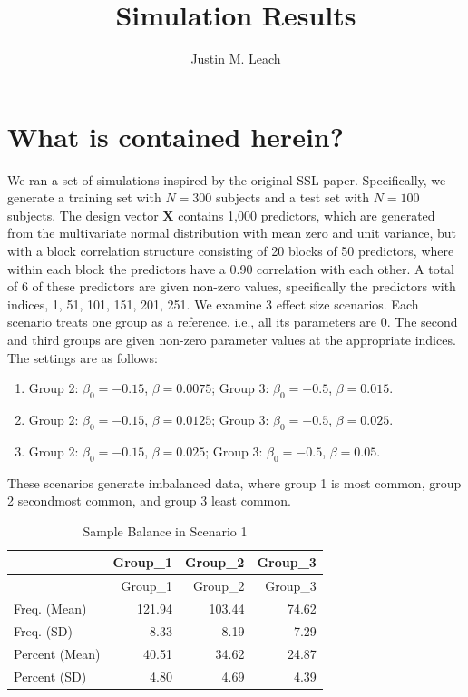 \documentclass[
]{article}
\title{Simulation Results}
\author{Justin M. Leach}
\date{}
\providecommand{\tightlist}{%
  \setlength{\itemsep}{0pt}\setlength{\parskip}{0pt}}
\begin{document}
\maketitle

\hypertarget{what-is-contained-herein}{%
\section{What is contained herein?}\label{what-is-contained-herein}}

We ran a set of simulations inspired by the original SSL paper.
Specifically, we generate a training set with \(N = 300\) subjects and a
test set with \(N = 100\) subjects. The design vector \(\bm{X}\)
contains 1,000 predictors, which are generated from the multivariate
normal distribution with mean zero and unit variance, but with a block
correlation structure consisting of 20 blocks of 50 predictors, where
within each block the predictors have a 0.90 correlation with each
other. A total of 6 of these predictors are given non-zero values,
specifically the predictors with indices, 1, 51, 101, 151, 201, 251. We
examine 3 effect size scenarios. Each scenario treats one group as a
reference, i.e., all its parameters are 0. The second and third groups
are given non-zero parameter values at the appropriate indices. The
settings are as follows:

\begin{enumerate}
\def\labelenumi{(\arabic{enumi})}
\tightlist
\item
  Group 2: \(\beta_0 = -0.15\), \(\beta = 0.0075\); Group 3:
  \(\beta_0 = -0.5\), \(\beta = 0.015\).
\item
  Group 2: \(\beta_0 = -0.15\), \(\beta = 0.0125\); Group 3:
  \(\beta_0 = -0.5\), \(\beta = 0.025\).
\item
  Group 2: \(\beta_0 = -0.15\), \(\beta = 0.025\); Group 3:
  \(\beta_0 = -0.5\), \(\beta = 0.05\).
\end{enumerate}

These scenarios generate imbalanced data, where group 1 is most common,
group 2 secondmost common, and group 3 least common.

\begin{longtable}[]{@{}lrrr@{}}
\caption{Sample Balance in Scenario 1}\tabularnewline
\toprule
& Group\_1 & Group\_2 & Group\_3 \\
\midrule
\endfirsthead
\toprule
& Group\_1 & Group\_2 & Group\_3 \\
\midrule
\endhead
Freq. (Mean) & 121.94 & 103.44 & 74.62 \\
Freq. (SD) & 8.33 & 8.19 & 7.29 \\
Percent (Mean) & 40.51 & 34.62 & 24.87 \\
Percent (SD) & 4.80 & 4.69 & 4.39 \\
\bottomrule
\end{longtable}
\end{document}
